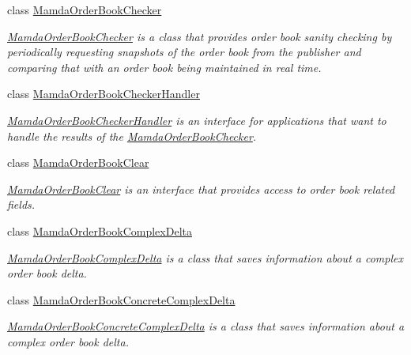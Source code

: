 \begin{CompactItemize}
class \hyperlink{classWombat_1_1MamdaOrderBookChecker}{Mamda\-Order\-Book\-Checker}
\begin{CompactList}\small\item\em \hyperlink{classWombat_1_1MamdaOrderBookChecker}{Mamda\-Order\-Book\-Checker} is a class that provides order book sanity checking by periodically requesting snapshots of the order book from the publisher and comparing that with an order book being maintained in real time. \item\end{CompactList}\item 
class \hyperlink{classWombat_1_1MamdaOrderBookCheckerHandler}{Mamda\-Order\-Book\-Checker\-Handler}
\begin{CompactList}\small\item\em \hyperlink{classWombat_1_1MamdaOrderBookCheckerHandler}{Mamda\-Order\-Book\-Checker\-Handler} is an interface for applications that want to handle the results of the \hyperlink{classWombat_1_1MamdaOrderBookChecker}{Mamda\-Order\-Book\-Checker}. \item\end{CompactList}\item 
class \hyperlink{classWombat_1_1MamdaOrderBookClear}{Mamda\-Order\-Book\-Clear}
\begin{CompactList}\small\item\em \hyperlink{classWombat_1_1MamdaOrderBookClear}{Mamda\-Order\-Book\-Clear} is an interface that provides access to order book related fields. \item\end{CompactList}\item 
class \hyperlink{classWombat_1_1MamdaOrderBookComplexDelta}{Mamda\-Order\-Book\-Complex\-Delta}
\begin{CompactList}\small\item\em \hyperlink{classWombat_1_1MamdaOrderBookComplexDelta}{Mamda\-Order\-Book\-Complex\-Delta} is a class that saves information about a complex order book delta. \item\end{CompactList}\item 
class \hyperlink{classWombat_1_1MamdaOrderBookConcreteComplexDelta}{Mamda\-Order\-Book\-Concrete\-Complex\-Delta}
\begin{CompactList}\small\item\em \hyperlink{classWombat_1_1MamdaOrderBookConcreteComplexDelta}{Mamda\-Order\-Book\-Concrete\-Complex\-Delta} is a class that saves information about a complex order book delta. \item\end{CompactList}\item 

\end{CompactItemize}
